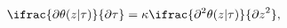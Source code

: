 \[\ifrac{\partial\theta(z|\tau)}{\partial\tau}=\kappa\ifrac{{\partial}^{2}\theta%
(z|\tau)}{{\partial z}^{2}},\]
